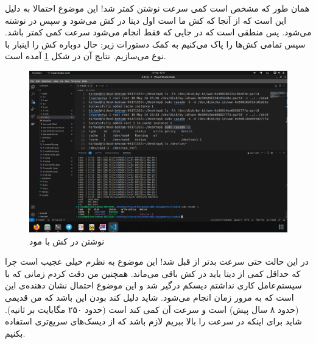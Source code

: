 همان طور که مشخص است کمی سرعت نوشتن کمتر شد! این موضوع احتمالا به دلیل این است که از آنجا که کش ما
است اول دیتا در
کش می‌شود و سپس در
نوشته می‌شود. پس منطقی است که در جایی که فقط
انجام می‌شود سرعت کمی کمتر باشد. سپس تمامی کش‌ها را پاک می‌کنیم به کمک دستورات زیر:
حال دوباره کش را اینبار با نوع
می‌سازیم. نتایج آن در شکل
\ref{fig:3-4-wb}
آمده است.
\begin{figure}[H]
    \centering
    \includegraphics[scale=0.25]{pic/3-wb.png}
    \caption{نوشتن در کش با مود }
    \label{fig:3-4-wb}
\end{figure}
در این حالت حتی سرعت بدتر از قبل شد! این موضوع به نظرم خیلی عجیب است چرا که حداقل کمی از دیتا باید در کش باقی
می‌ماند. همچنین من دقت کردم زمانی که با سیستم‌عامل کاری نداشتم دیسکم درگیر شد و این موضوع احتمال نشان دهنده‌ی
این است که به مرور زمان
انجام می‌شود. شاید دلیل کند بودن این باشد که
من قدیمی
(حدود ۸ سال پیش)
است و سرعت آن کمی کند است
(حدود ۲۵۰ مگابایت بر ثانیه).
شاید برای اینکه در
سرعت را بالا ببریم لازم باشد که از دیسک‌های سریع‌تری استفاده بکنیم.

